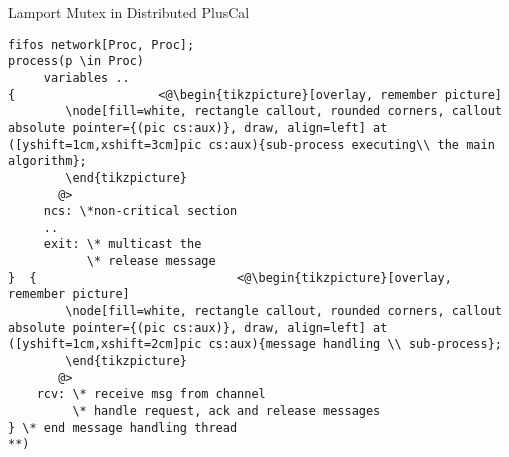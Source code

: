 \documentclass{beamer}
\begin{document}
\begin{frame}[fragile]{Lamport Mutex in Distributed PlusCal}
\begin{exampleblock}{} 
\begin{lstlisting}[language=pluscal, frame = none, numbers = none]
fifos network[Proc, Proc];
process(p \in Proc)
     variables ..
{                    <@\begin{tikzpicture}[overlay, remember picture]
        \node[fill=white, rectangle callout, rounded corners, callout absolute pointer={(pic cs:aux)}, draw, align=left] at ([yshift=1cm,xshift=3cm]pic cs:aux){sub-process executing\\ the main algorithm};
        \end{tikzpicture}
       @>
     ncs: \*non-critical section
     .. 
     exit: \* multicast the
           \* release message 
}  {                            <@\begin{tikzpicture}[overlay, remember picture]
        \node[fill=white, rectangle callout, rounded corners, callout absolute pointer={(pic cs:aux)}, draw, align=left] at ([yshift=1cm,xshift=2cm]pic cs:aux){message handling \\ sub-process};
        \end{tikzpicture}
       @>
    rcv: \* receive msg from channel
         \* handle request, ack and release messages
} \* end message handling thread
**)
\end{lstlisting}
\end{exampleblock}
\end{frame}
\end{document}
